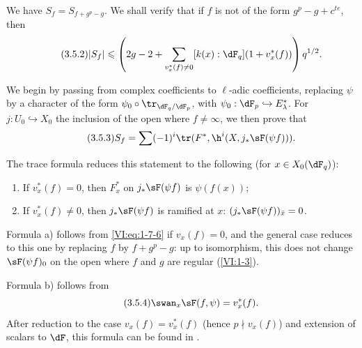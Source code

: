 We have $S_f=S_{f+g^p-g}$. We shall verify that if $f$ is not of the 
form $g^p-g+c^{t e}$, then 
\begin{equation*}\tag{3.5.2}\label{VI:eq:3-5-2}
  |S_f|\leqslant \left(2 g-2+\sum_{v_x^\ast(f)\ne 0} [k(x):\dF_q] (1+v_x^\ast(f))\right) q^{1/2} \text{.}
\end{equation*}

We begin by passing from complex coefficients to $\ell$-adic coefficients, replacing $\psi$ by 
a character of the form $\psi_0\circ \tr_{\dF_q/\dF_p}$, with 
$\psi_0:\dF_p\hookrightarrow E_\lambda^\ast$. For $j:U_0\hookrightarrow X_0$ 
the inclusion of the open where $f\ne\infty$, we then prove that 
\begin{equation*}\tag{3.5.3}\label{VI:eq:3-5-3}
  S_f = \sum (-1)^i \tr(F^\ast,\h^i(X,j_\ast \sF(\psi f))) \text{.} 
\end{equation*}

The trace formula reduces this statement to the following (for 
$x\in X_0(\dF_q)$): 
\begin{enumerate}[\indent a)]
  \item If $v_x^\ast(f)=0$, then $F_x^\ast$ on $j_\ast \sF(\psi f)$ is 
    $\psi(f(x))$; 
  \item If $v_x^\ast(f)\ne 0$, then $j_\ast \sF(\psi f)$ is ramified at $x$: 
    $(j_\ast \sF(\psi f))_{\bar x}=0$. 
\end{enumerate}

Formula a) follows from \eqref{VI:eq:1-7-6} if $v_x(f)=0$, and the general 
case reduces to this one by replacing $f$ by $f+g^p-g$: up to isomorphism, this 
does not change $\sF(\psi f)_0$ on the open where $f$ and $g$ are regular 
(\ref{VI:1-3}). 

Formula b) follows from 
\begin{equation*}\tag{3.5.4}\label{VI:eq:3-5-4}
  \swan_x \sF(f,\psi) = v_x^\ast(f) \text{.} 
\end{equation*}
After reduction to the case $v_x(f)=v_x^\ast(f)$ (hence $p\nmid v_x(f)$) 
and extension of scalars to $\dF$, this formula can be found in 
.

